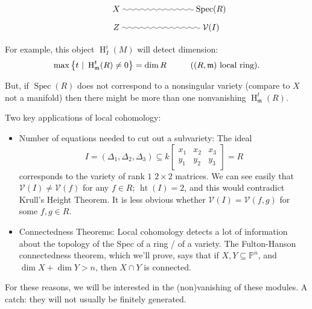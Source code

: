 \documentclass[11pt]{book}
\numberwithin{equation}{section}
\numberwithin{theorem}{chapter}
\theoremstyle{definition}
\newtheorem*{basic properties}{Basic Properties}
\newtheorem*{Important Remark}{Important Remark}
\theoremstyle{remark}
\newcommand{\m}{\mathfrak{m}}
\newcommand{\V}{\mathcal{V}}
\newcommand{\Spec}{\operatorname{Spec}}
\newcommand{\height}{\operatorname{ht}}
\renewcommand{\dim}{\operatorname{dim}}
\renewcommand{\height}{\operatorname{ht}}
\renewcommand{\H}{\operatorname{H}}
\begin{document}
$$\xymatrix@R=2mm{& X \ar@{~}[rrr] &&& \Spec(R) \\ & Z \ar@{~}[rrr] &&& \V(I)}$$

For example, this object $\H^i_I(M)$ will detect dimension:
$$\max \left\lbrace t \ | \ \H^t_\m(R) \neq 0 \right\rbrace = \dim R \hskip 10mm ((R,\m) \textrm{ local ring}).$$

But, if $\Spec(R)$ does not correspond to a nonsingular variety (compare to $X$ not a manifold) then there might be more than one nonvanishing $\H^t_\m(R)$.

\vskip 1cm

Two key applications of local cohomology:

\begin{itemize}
\renewcommand{\labelitemi}{\LARGE$\star$}
	\item Number of equations needed to cut out a subvariety: 
	The ideal 
	$$I = \left( \Delta_1, \Delta_2, \Delta_3 \right) \subseteq k \left[ \begin{array}{ccc} x_1 & x_2 & x_3 \\ y_1 & y_2 & y_3 \end{array} \right] = R$$
	corresponds to the variety of rank $1$ $2 \times 2$ matrices. We can see easily that $\V(I) \neq \V(f)$ for any $f \in R$; $\height(I) = 2$, and this would contradict Krull's Height Theorem. It is less obvious whether $\V(I) = \V(f,g)$ for some $f, g \in R$.
	
	\item Connectedness Theorems: Local cohomology detects a lot of information about the topology of the Spec of a ring / of a variety. The Fulton-Hanson connectedness theorem, which we'll prove, says that if $X,Y\subseteq \mathbb{P}^n$, and $\dim X + \dim Y > n$, then $X \cap Y$ is connected. 
\end{itemize}


For these reasons, we will be interested in the (non)vanishing of these modules.
A catch: they will not usually be finitely generated.
\end{document}
